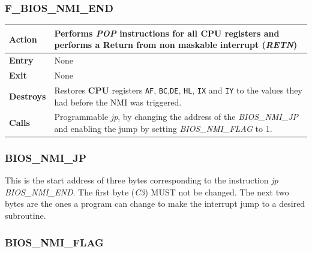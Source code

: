 \documentclass[a4paper,11pt]{article}
\begin{document}
    \subsubsection{F\_BIOS\_NMI\_END}
    \label{func:fbiosnmiend}
    \begin{tabular}{l p{9cm}}
        \hline\textbf{Action}
        & Performs \textit{POP} instructions for all \textbf{CPU} registers and
        performs a Return from non maskable interrupt (\textit{RETN})\\
        \hline\textbf{Entry} & None\\
        \hline\textbf{Exit} & None\\
        \hline\textbf{Destroys} & Restores \textbf{CPU} registers \texttt{AF},
        \texttt{BC},\texttt{DE}, \texttt{HL}, \texttt{IX} and \texttt{IY} to the
        values they had before the NMI was triggered.\\
        \hline\textbf{Calls} & Programmable \textit{jp}, by changing the address
        of the \textit{BIOS\_NMI\_JP} and enabling the jump by setting 
        \textit{BIOS\_NMI\_FLAG} to 1.\\
        \hline
    \end{tabular}

    \subsubsection{BIOS\_NMI\_JP}
    \label{func:fbiosnmijp}

    This is the start address of three bytes corresponding to the instruction
    \textit{jp BIOS\_NMI\_END}. The first byte (\textit{C3}) MUST not be changed.
    The next two bytes are the ones a program can change to make the interrupt
    jump to a desired subroutine.

    \subsubsection{BIOS\_NMI\_FLAG}
    \label{func:fbiosnmiflag}
\end{document}
